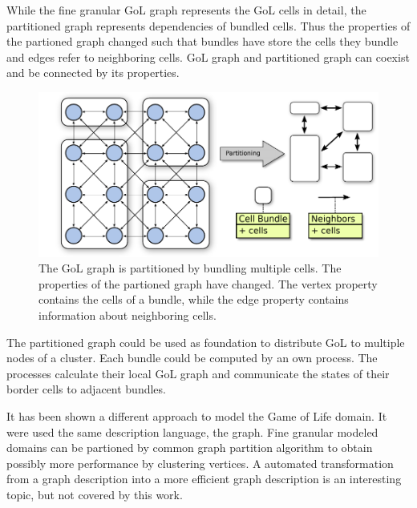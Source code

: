 While the fine granular GoL graph represents the GoL cells in detail, the
partitioned graph represents dependencies of bundled cells. Thus
the properties of the partioned graph changed such that bundles
have store the cells they bundle and edges refer to neighboring
cells. GoL graph and partitioned graph can coexist and be connected
by its properties.

\begin{figure}[H]
  \centering \includegraphics[width=\textwidth]{graphics/30_gol_bundle}
  \caption{The GoL graph is partitioned by bundling multiple
    cells. The properties of the partioned graph have changed. The
    vertex property contains the cells of a bundle, while the edge
    property contains information about neighboring cells.}
  \label{fig:gol_bundle}
\end{figure}

The partitioned graph could be used as foundation to distribute GoL to
multiple nodes of a cluster. Each bundle could be computed by an own
process. The processes calculate their local GoL graph and
communicate the states of their border cells to adjacent bundles.

It has been shown a different approach to model the Game of Life
domain. It were used the same description language, the graph.  Fine
granular modeled domains can be partioned by common graph partition
algorithm to obtain possibly more performance by clustering
vertices. A automated transformation from a graph description into a
more efficient graph description is an interesting topic, but not
covered by this work.


